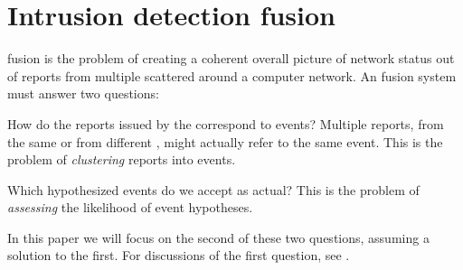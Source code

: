 \section{Intrusion detection fusion}
\label{sec:ids-fusion}
{\ids} fusion %
is the
problem of creating a
coherent overall picture of network status out of reports from multiple
{\idses} scattered around a computer network. %
An \ids fusion system must answer two questions:
\begin{compactenum}
\item How do the reports issued by the \idses correspond to events? Multiple
  reports, from the same \ids or from different \idses,  might
  actually refer to the same event. This is the problem of \emph{clustering}
  reports into events.
\item Which hypothesized events do we accept as actual?  This is the problem of
  \emph{assessing} the likelihood of event hypotheses.
\end{compactenum}
In this paper we will focus on the second of these two questions, assuming a
solution to the first.  For discussions of the first question, see
.

